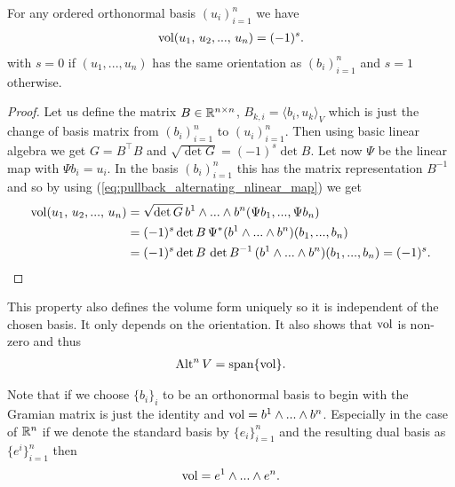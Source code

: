 \documentclass[../master_thesis.tex]{subfiles}
\begin{document}
\begin{proposition}
    For any ordered
    orthonormal basis $(u_i)_{i=1}^n$ we have 
    \begin{align*}
        \operatorname{vol} (u_1,\,u_2,...,\,u_n) = (-1)^s.
    \end{align*}
    with $s=0$ if $(u_1,...,u_n)$ has the same orientation as $(b_i)_{i=1}^n$ 
    and $s=1$ otherwise. 
\end{proposition}
\begin{proof}
    Let us define the matrix $B \in \mathbb{R}^{n\times n}$, $B_{k,i} = \langle b_i, u_k
    \rangle_V$ which is just the change of basis matrix from $( b_i )_{i=1}^n$ 
    to $( u_i )_{i=1}^n$. 
    Then using basic linear algebra we get
    $ G = B^\top B$ and 
    $\sqrt{\det G} = (-1)^s \det B$. Let now $\Psi$ be the linear map with 
    $\Psi b_i = u_i$. In the basis $( b_i )_{i=1}^n$ this has the matrix 
    representation $B^{-1}$ and so by using 
    (\ref{eq:pullback_alternating_nlinear_map}) we get
    \begin{align*}
        \operatorname{vol} (u_1,\,u_2,...,\,u_n) &= \sqrt{ \det G} \, b^1 \wedge ... \wedge b^n 
        ( \Psi b_1,..., \Psi b_n )
        \\ &= (-1)^s \det B \, \Psi^* (b^1 \wedge ... \wedge b^n )( b_1,..., b_n) 
        \\ &= (-1)^s \det B \, \det B^{-1} \, (b^1 \wedge ... \wedge b^n )( b_1,..., b_n)
        = (-1)^s.
    \end{align*}
\end{proof}
This property also defines the volume form uniquely so it is independent of the 
chosen basis. It only depends on the orientation.
It also shows that $\operatorname{vol}$ is non-zero and thus 
\begin{align*}
    {\text{Alt}^{n}\,V} = \text{span} \{ \operatorname{vol} \}.
\end{align*}

Note that if we choose $\{ b_i \}_{i}$ to be an orthonormal basis to begin 
with the Gramian matrix is just the identity and 
$\operatorname{vol} = b^1 \wedge ... \wedge b^n$. Especially in the case of $\mathbb{R}^n$ if 
we denote the standard basis by $\{ e_i \}_{i=1}^n$ and the resulting 
dual basis as $\{ e^i \}_{i=1}^n$ then 
\begin{align*}
    \operatorname{vol} = e^1 \wedge ... \wedge e^n.
\end{align*}
\end{document}
